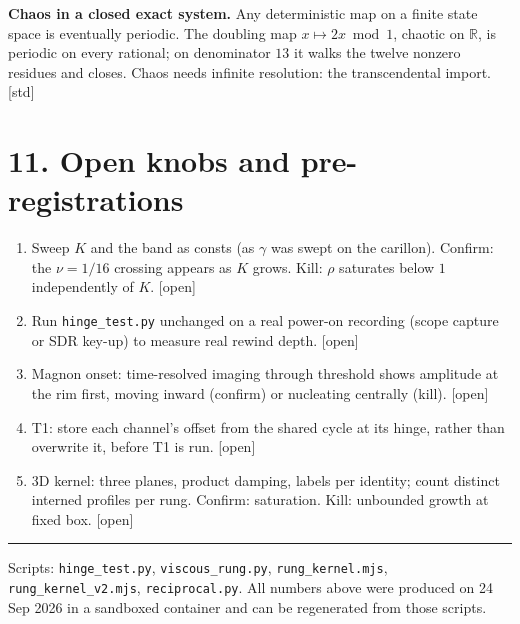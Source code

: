 \documentclass[11pt,a4paper]{article}
\newcommand{\stamp}[1]{\textsf{\small[#1]}}
\begin{document}
\textbf{Chaos in a closed exact system.} Any deterministic map on a finite state space is eventually periodic. The doubling map $x\mapsto2x\bmod1$, chaotic on $\mathbb R$, is periodic on every rational; on denominator $13$ it walks the twelve nonzero residues and closes. Chaos needs infinite resolution: the transcendental import. \stamp{std}

\section*{11. Open knobs and pre-registrations}
\begin{enumerate}[leftmargin=2em]
\item Sweep $K$ and the band as consts (as $\gamma$ was swept on the carillon). Confirm: the $\nu=1/16$ crossing appears as $K$ grows. Kill: $\rho$ saturates below $1$ independently of $K$. \stamp{open}
\item Run \texttt{hinge\_test.py} unchanged on a real power-on recording (scope capture or SDR key-up) to measure real rewind depth. \stamp{open}
\item Magnon onset: time-resolved imaging through threshold shows amplitude at the rim first, moving inward (confirm) or nucleating centrally (kill). \stamp{open}
\item T1: store each channel's offset from the shared cycle at its hinge, rather than overwrite it, before T1 is run. \stamp{open}
\item 3D kernel: three planes, product damping, labels per identity; count distinct interned profiles per rung. Confirm: saturation. Kill: unbounded growth at fixed box. \stamp{open}
\end{enumerate}

\vspace{0.5em}\hrule\vspace{0.3em}
{\small Scripts: \texttt{hinge\_test.py}, \texttt{viscous\_rung.py}, \texttt{rung\_kernel.mjs}, \texttt{rung\_kernel\_v2.mjs}, \texttt{reciprocal.py}. All numbers above were produced on 24 Sep 2026 in a sandboxed container and can be regenerated from those scripts.}
\end{document}
